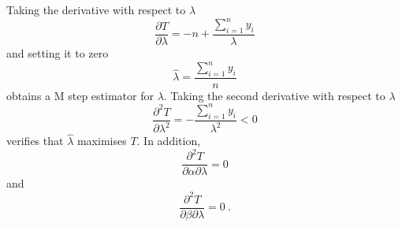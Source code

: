 Taking the derivative with respect to $\lambda$
\begin{equation}
  \frac{\partial T}{\partial\lambda} = -n + \frac{\sum_{i=1}^ny_i}{\lambda}
\end{equation}
and setting it to zero
\begin{equation}
  \widehat{\lambda} = \frac{\sum_{i=1}^n y_i}{n}
\end{equation}
obtains a M step estimator for $\lambda$. Taking the second derivative with respect to $\lambda$
\begin{equation}
  \frac{\partial^2 T}{\partial \lambda^2} = -\frac{\sum_{i=1}^ny_i}{\lambda^2} < 0
\end{equation}
verifies that $\widehat{\lambda}$ maximises $T$. In addition,
\begin{equation}
  \frac{\partial^2 T}{\partial \alpha \partial \lambda } = 0
\end{equation}
and
\begin{equation}
  \frac{\partial^2 T}{\partial \beta \partial \lambda } = 0
  \ .
\end{equation}

